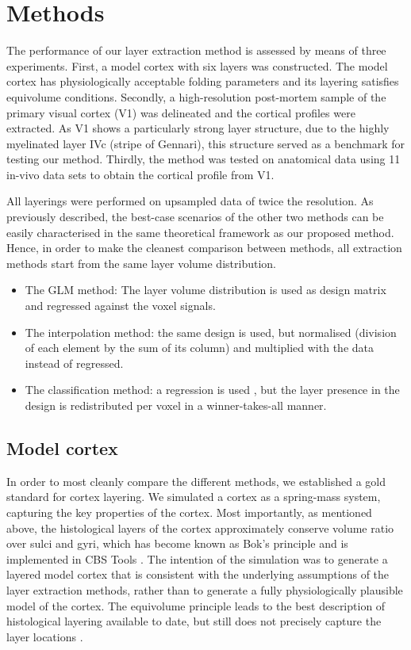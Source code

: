 \section{Methods}
The performance of our layer extraction method is assessed by means of three experiments. First, a model cortex with six layers was constructed. The model cortex has physiologically acceptable folding parameters and its layering satisfies equivolume conditions. Secondly, a high-resolution post-mortem sample of the primary visual cortex (V1) was delineated and the cortical profiles were extracted. As V1 shows a particularly strong layer structure, due to the highly myelinated layer IVc (stripe of Gennari), this structure served as a benchmark for testing our method. Thirdly, the method was tested on anatomical data using 11 in-vivo data sets to obtain the cortical profile from V1.

All layerings were performed on upsampled data of twice the resolution. As previously described, the best-case scenarios of the other two methods can be easily characterised in the same theoretical framework as our proposed method. Hence, in order to make the cleanest comparison between methods, all extraction methods start from the same layer volume distribution. 
\begin{itemize}
\item The GLM method: The layer volume distribution is used as design matrix and regressed against the voxel signals.
\item The interpolation method: the same design is used, but normalised (division of each element by the sum of its column) and multiplied with the data instead of regressed.
\item The classification method: a regression is used , but the layer presence in the design is redistributed per voxel in a winner-takes-all manner. 
\end{itemize}

\subsection{Model cortex 
\label{sec:Simulation}}
In order to most cleanly compare the different methods, we established a gold standard for cortex layering. We simulated a cortex as a spring-mass system, capturing the key properties of the cortex. Most importantly, as mentioned above, the histological layers of the cortex approximately conserve volume ratio over sulci and gyri, which has become known as Bok's principle \cite{Bok1929,Waehnert2014} and is implemented in CBS Tools \cite{Bazin2014}. The intention of the simulation was to generate a layered model cortex that is consistent with the underlying assumptions of the layer extraction methods, rather than to generate a fully physiologically plausible model of the cortex. The equivolume principle leads to the best description of histological layering available to date, but still does not precisely capture the layer locations \cite{Waehnert2016}.

